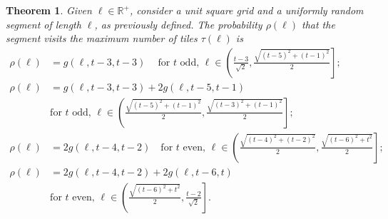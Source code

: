 \documentclass[12pt, a4paper]{article}
\newcommand{\funt}{\tau} %
\newcommand{\probmax}{\rho} %
\newcommand{\len}{\ell} %
\newcommand{\tiles}{t} %
\newtheorem{theorem}{Theorem}%
\begin{document}
\begin{theorem}
\label{theo: probmax, sq}
Given $\len \in \mathbb R^+$, consider a unit square grid and a uniformly random segment of length $\len$, as previously defined. The probability $\probmax(\len)$ that the segment visits the maximum number of tiles $\funt(\len)$ is
\begin{equation}
\label{eq: probmax}
\begin{split}
\probmax(\len) & = g\left(\len, 
\tiles-3, \tiles-3 \right) \quad\ \text{for } \tiles \text{ odd, } \textstyle \len \in \left( \frac{\tiles-3}{\sqrt{2}}, \frac{\sqrt{(\tiles-5)^2+(\tiles-1)^2}} 2 \right]; \\
\probmax(\len) & = g\left(\len, \tiles-3, \tiles-3 \right) + 2 g\left(\len, \tiles-5, \tiles-1 \right) \\
& \text{for } \tiles \text{ odd, } \textstyle \len \in \left (\frac{\sqrt{(\tiles-5)^2+(\tiles-1)^2}} 2,  \frac{\sqrt{(\tiles-3)^2+(\tiles-1)^2}} 2 \right]; \\
\probmax(\len) & = 2 g\left(\len, \tiles-4, \tiles-2 \right) \quad \text{for } \tiles \text{ even, } \textstyle \len \in \left( \frac{\sqrt{(\tiles-4)^2+(\tiles-2)^2}} 2, \frac{\sqrt{(\tiles-6)^2+\tiles^2}} 2 \right]; \\
\probmax(\len) & = 2 g\left(\len, \tiles-4, \tiles-2 \right) + 2 g\left(\len, \tiles-6, \tiles \right) \\
& \text{for } \tiles \text{ even, } \textstyle \len \in \left( \frac{\sqrt{(\tiles-6)^2+\tiles^2}} 2, \frac{\tiles-2}{\sqrt{2}} \right].
\end{split}
\end{equation}
\end{theorem}
\end{document}
